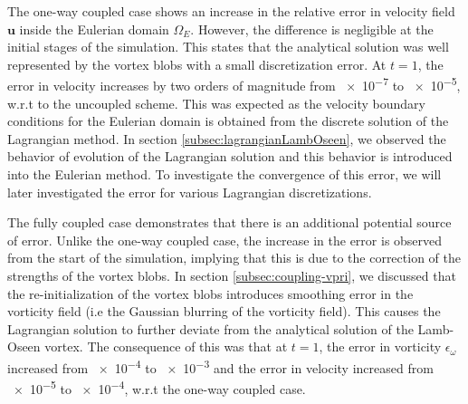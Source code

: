 The one-way coupled case shows an increase in the relative error in velocity field $\mathbf{u}$ inside the Eulerian domain $\Omega_E$. However, the difference is negligible at the initial stages of the simulation. This states that the analytical solution was well represented by the vortex blobs with a small discretization error. At $t=1$, the error in velocity increases by two orders of magnitude from \num{e-7} to \num{e-5}, w.r.t to the uncoupled scheme. This was expected as the velocity boundary conditions for the Eulerian domain is obtained from the discrete solution of the Lagrangian method. In section \ref{subsec:lagrangianLambOseen}, we observed the behavior of evolution of the Lagrangian solution and this behavior is introduced into the Eulerian method. To investigate the convergence of this error, we will later investigated the error for various Lagrangian discretizations.

The fully coupled case demonstrates that there is an additional potential source of error. Unlike the one-way coupled case, the increase in the error is observed from the start of the simulation, implying that this is due to the correction of the strengths of the vortex blobs. In section \ref{subsec:coupling-vpri}, we discussed that the re-initialization of the vortex blobs introduces smoothing error in the vorticity field (i.e the Gaussian blurring of the vorticity field). This causes the Lagrangian solution to further deviate from the analytical solution of the Lamb-Oseen vortex. The consequence of this was that at $t=1$, the error in vorticity $\epsilon_{\omega}$ increased from \num{e-4} to \num{e-3} and the error in velocity increased from \num{e-5} to \num{e-4}, w.r.t the one-way coupled case.


